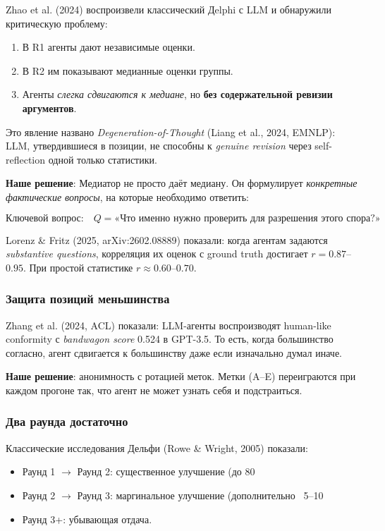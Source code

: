 Zhao et al. (2024) воспроизвели классический Дelphi с LLM и обнаружили критическую проблему:

\begin{enumerate}
    \item В R1 агенты дают независимые оценки.
    \item В R2 им показывают медианные оценки группы.
    \item Агенты \emph{слегка сдвигаются к медиане}, но \textbf{без содержательной ревизии аргументов}.
\end{enumerate}

Это явление названо \emph{Degeneration-of-Thought} (Liang et al., 2024, EMNLP): LLM, утвердившиеся в позиции, не способны к \emph{genuine revision} через self-reflection одной только статистики.

\textbf{Наше решение}: Медиатор не просто даёт медиану. Он формулирует \emph{конкретные фактические вопросы}, на которые необходимо ответить:

\begin{equation}
    \text{Ключевой вопрос:} \quad Q = \text{«Что именно нужно проверить для разрешения этого спора?»}
\end{equation}

Lorenz \& Fritz (2025, arXiv:2602.08889) показали: когда агентам задаются \emph{substantive questions}, корреляция их оценок с ground truth достигает $r = 0.87$--$0.95$. При простой статистике $r \approx 0.60$--$0.70$.

\subsubsection{Защита позиций меньшинства}

Zhang et al. (2024, ACL) показали: LLM-агенты воспроизводят human-like conformity с \emph{bandwagon score} 0.524 в GPT-3.5. То есть, когда большинство согласно, агент сдвигается к большинству даже если изначально думал иначе.

\textbf{Наше решение}: анонимность с ротацией меток. Метки (A–E) переиграются при каждом прогоне так, что агент не может узнать себя и подстраиться.

\subsubsection{Два раунда достаточно}

Классические исследования Дельфи (Rowe \& Wright, 2005) показали:
\begin{itemize}
    \item Раунд 1 $\to$ Раунд 2: существенное улучшение (до 80%
    \item Раунд 2 $\to$ Раунд 3: маргинальное улучшение (дополнительно ~5–10%
    \item Раунд 3+: убывающая отдача.
\end{itemize}

